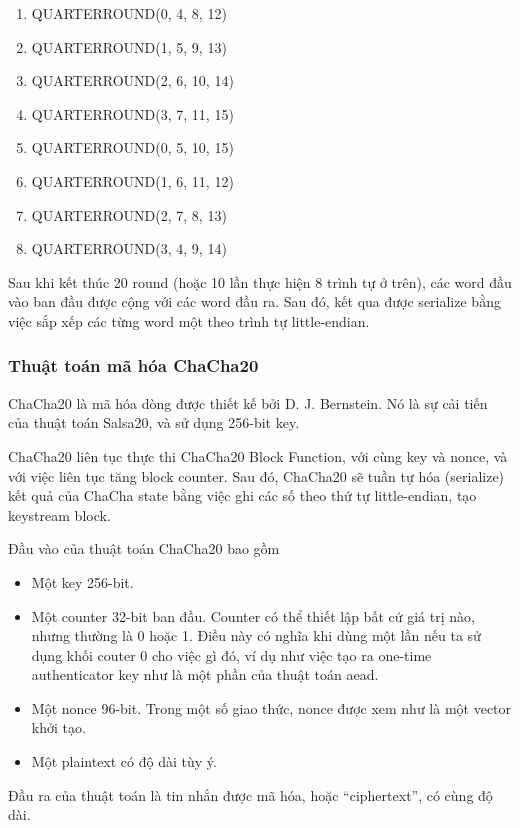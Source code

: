 \begin{enumerate}
    \item QUARTERROUND(0, 4, 8, 12)
    \item QUARTERROUND(1, 5, 9, 13)
    \item QUARTERROUND(2, 6, 10, 14)
    \item QUARTERROUND(3, 7, 11, 15)
    \item QUARTERROUND(0, 5, 10, 15)
    \item QUARTERROUND(1, 6, 11, 12)
    \item QUARTERROUND(2, 7, 8, 13)
    \item QUARTERROUND(3, 4, 9, 14)
\end{enumerate}

Sau khi kết thúc 20 round (hoặc 10 lần thực hiện 8 trình tự ở trên), các word đầu vào ban đầu được cộng với các word đầu ra. Sau đó, kết qua được serialize bằng việc sắp xếp các từng word một theo trình tự little-endian.

\subsubsection{Thuật toán mã hóa ChaCha20}

ChaCha20 là mã hóa dòng được thiết kế bởi D. J. Bernstein. Nó là sự cải tiến của thuật toán Salsa20, và sử dụng 256-bit key.

ChaCha20 liên tục thực thi ChaCha20 Block Function, với cùng key và nonce, và với việc liên tục tăng block counter. Sau đó, ChaCha20 sẽ tuần tự hóa (serialize) kết quả của ChaCha state bằng việc ghi các số theo thứ tự little-endian, tạo keystream block.

Đầu vào của thuật toán ChaCha20 bao gồm
\begin{itemize}
    \item Một key 256-bit.
    \item Một counter 32-bit ban đầu. Counter có thể thiết lập bất cứ giá trị nào, nhưng thường là 0 hoặc 1. Điều này có nghĩa khi dùng một lần nếu ta sử dụng khối couter 0 cho việc gì đó, ví dụ như việc tạo ra one-time authenticator key như là một phần của thuật toán \acrshort{aead}.
    \item Một nonce 96-bit. Trong một số giao thức, nonce được xem như là một vector khởi tạo.
    \item Một plaintext có độ dài tùy ý.
\end{itemize}

Đầu ra của thuật toán là tin nhắn được mã hóa, hoặc ``ciphertext'', có cùng độ dài.

